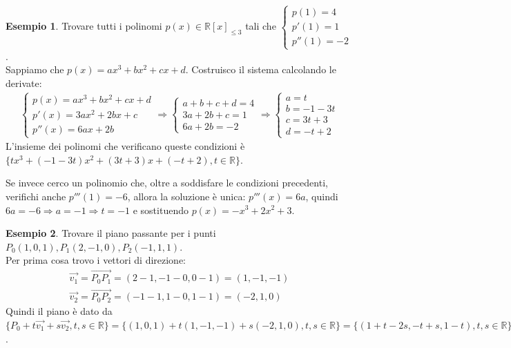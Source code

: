 \documentclass[a4paper]{article}
\theoremstyle{definition}
\newtheorem*{es}{Esempio}
\begin{document}
	\begin{es}
		Trovare tutti i polinomi $p(x) \in \mathbb{R}[x]_{\leq 3}$ tali che $\begin{cases}
			p(1) = 4 \\
			p'(1) = 1 \\
			p''(1) = -2
		\end{cases}$. \\
		Sappiamo che $p(x) = ax^3 + bx^2 + cx + d$. Costruisco il sistema calcolando le derivate:
		\begin{align*}
			\begin{cases}
				p(x) = ax^3 + bx^2 + cx + d \\
				p'(x) = 3ax^2 + 2bx + c \\
				p''(x) = 6ax + 2b
			\end{cases} \Rightarrow \begin{cases}
				a + b + c + d = 4 \\
				3a + 2b + c = 1 \\
				6a + 2b = -2
			\end{cases} \Rightarrow \begin{cases}
				a = t \\
				b = - 1 - 3t \\
				c = 3t + 3 \\
				d = - t + 2
			\end{cases}
		\end{align*}
		L'insieme dei polinomi che verificano queste condizioni è $\{tx^3 + (-1 - 3t)x^2 + (3t + 3)x + (- t + 2), t \in \mathbb{R}\}$.
	\end{es}

	Se invece cerco un polinomio che, oltre a soddisfare le condizioni precedenti, verifichi anche $p'''(1) = -6$, allora la soluzione è unica:
	$p'''(x) = 6a$, quindi $6a = -6 \Rightarrow a = -1 \Rightarrow t = -1$ e sostituendo $p(x) = -x^3 + 2x^2 + 3$.

	\begin{es}
		Trovare il piano passante per i punti $P_0(1, 0, 1), P_1(2, -1, 0), P_2(-1, 1, 1)$. \\
		Per prima cosa trovo i vettori di direzione:
		\begin{align*}
			\overrightarrow{v_1} = \overrightarrow{P_0P_1} = (2 - 1, -1 - 0, 0 - 1) = (1, -1, -1) \\
			\overrightarrow{v_2} =\overrightarrow{P_0P_2} = (-1 - 1, 1 - 0, 1 - 1) = (-2, 1, 0)
		\end{align*}
		Quindi il piano è dato da $\{P_0 + t \overrightarrow{v_1} + s \overrightarrow{v_2}, t, s \in \mathbb{R}\} =
		\{(1, 0, 1) + t(1, -1, -1) + s(-2, 1, 0), t, s \in \mathbb{R}\} = \{(1 + t - 2s, -t + s, 1 - t), t, s \in \mathbb{R}\}
		= \{(x, y, z) \in \mathbb{R}^3 \mid x + 2y - z = 0\}$.
	\end{es}
\end{document}
